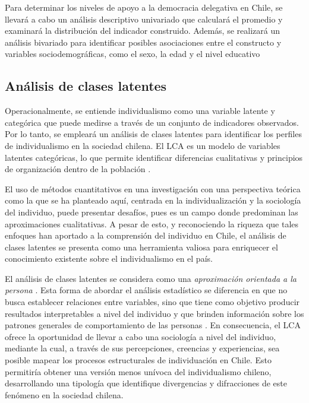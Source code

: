 \documentclass[12pt,twoside]{templates/facsothesis}
\begin{document}
Para determinar los niveles de apoyo a la democracia delegativa en Chile, se llevará a cabo un análisis descriptivo univariado que calculará el promedio y examinará la distribución del indicador construido. Además, se realizará un análisis bivariado para identificar posibles asociaciones entre el constructo y variables sociodemográficas, como el sexo, la edad y el nivel educativo

\hypertarget{anuxe1lisis-de-clases-latentes}{%
\subsection{Análisis de clases latentes}\label{anuxe1lisis-de-clases-latentes}}

Operacionalmente, se entiende individualismo como una variable latente y categórica que puede medirse a través de un conjunto de indicadores observados. Por lo tanto, se empleará un análisis de clases latentes para identificar los perfiles de individualismo en la sociedad chilena. El LCA es un modelo de variables latentes categóricas, lo que permite identificar diferencias cualitativas y principios de organización dentro de la población \citep{collins2010}.

El uso de métodos cuantitativos en una investigación con una perspectiva teórica como la que se ha planteado aquí, centrada en la individualización y la sociología del individuo, puede presentar desafíos, pues es un campo donde predominan las aproximaciones cualitativas. A pesar de esto, y reconociendo la riqueza que tales enfoques han aportado a la comprensión del individuo en Chile, el análisis de clases latentes se presenta como una herramienta valiosa para enriquecer el conocimiento existente sobre el individualismo en el país.

El análisis de clases latentes se considera como una \emph{aproximación orientada a la persona} \citep{collins2010}. Esta forma de abordar el análisis estadístico se diferencia en que no busca establecer relaciones entre variables, sino que tiene como objetivo producir resultados interpretables a nivel del individuo y que brinden información sobre los patrones generales de comportamiento de las personas \citep{bergman2015}. En consecuencia, el LCA ofrece la oportunidad de llevar a cabo una sociología a nivel del individuo, mediante la cual, a través de sus percepciones, creencias y experiencias, sea posible mapear los procesos estructurales de individuación en Chile. Esto permitiría obtener una versión menos unívoca del individualismo chileno, desarrollando una tipología que identifique divergencias y difracciones de este fenómeno en la sociedad chilena.
\end{document}
